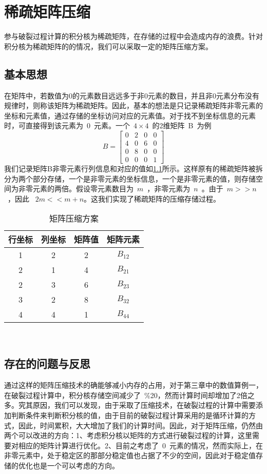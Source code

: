        \appendix
\chapter{稀疏矩阵压缩}

\indent 参与破裂过程计算的积分核为稀疏矩阵，在存储的过程中会造成内存的浪费。针对积分核为稀疏矩阵的的情况，我们可以采取一定的矩阵压缩方案。

\section{基本思想}
\indent 在矩阵中，若数值为0的元素数目远远多于非0元素的数目，并且非0元素分布没有规律时，则称该矩阵为稀疏矩阵。因此，基本的想法是只记录稀疏矩阵非零元素的坐标和元素值，通过存储的坐标访问对应的元素值。对于找不到坐标信息的元素时，可直接得到该元素为~0~元素。一个~$4 \times 4$~的2维矩阵~B~为例
$$ B = 
\begin{bmatrix}
   0 & 2 & 0& 0 \\
   4 & 0 & 6 & 0\\
   0 & 8 & 0 & 0\\
   0 & 0 & 0 & 1
  \end{bmatrix} \tag{三维稀疏矩阵}
 $$
 我们记录矩阵B非零元素行列信息和对应的值如\ref{juzhen-yasuo}所示。这样原有的稀疏矩阵被拆分为两个部分存储，一个是非零元素的坐标信息，一个是非零元素的值，则存储空间为非零元素的两倍。假设零元素数目为~$m$~，非零元素为~$n$~。由于~$m>>n$~，因此 ~$2m<<m+n$。这我们实现了稀疏矩阵的压缩存储过程。

\begin{table}
\centering  
\caption{矩阵压缩方案} \label{juzhen-yasuo} 
\begin{tabular}{|c|c|c|c|}
 \hline
行坐标&列坐标& 矩阵值& 矩阵元素\\
 \hline
1 & 2 & 2& $B_{12}$ \\
 \hline
2&1 & 4 &  $B_{21}$\\
 \hline
2 & 3 & 6& $B_{23}$\\
 \hline
3 & 2 & 8& $B_{32}$ \\
 \hline
4 & 4 & 1& $B_{44}$ \\
\hline
\end{tabular}\\
\end{table}


 \section{存在的问题与反思}
 \indent 通过这样的矩阵压缩技术的确能够减小内存的占用，对于第三章中的数值算例一，在破裂过程计算中，积分核存储空间减少了~\%20，然而计算时间却增加了2倍之多。究其原因，我们可以发现，由于采取了压缩技术，在破裂过程的计算中需要添加判断条件来判断积分核的值，由于目前的破裂过程计算采用的是循环计算的方式，因此，时间累积，大大增加了我们的计算时间。因此，对于矩阵压缩，仍然由两个可以改进的方向：1、考虑积分核以矩阵的方式进行破裂过程的计算，这里需要对相应的矩阵计算进行优化。2、目前之考虑了~0~元素的情况，然而实际上，在非零元素中，处于稳定区的那部分稳定值也占据了不少的空间，因此对于稳定值存储的优化也是一个可以考虑的方向。
 
